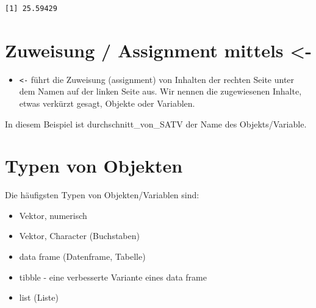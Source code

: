 \documentclass[
  letterpaper,
  DIV=11,
  numbers=noendperiod]{scrreprt}
\newenvironment{Shaded}{\begin{snugshade}}{\end{snugshade}}
\newcommand{\AttributeTok}[1]{\textcolor[rgb]{0.40,0.45,0.13}{#1}}
\newcommand{\ConstantTok}[1]{\textcolor[rgb]{0.56,0.35,0.01}{#1}}
\newcommand{\FunctionTok}[1]{\textcolor[rgb]{0.28,0.35,0.67}{#1}}
\newcommand{\NormalTok}[1]{\textcolor[rgb]{0.00,0.23,0.31}{#1}}
\newcommand{\OtherTok}[1]{\textcolor[rgb]{0.00,0.23,0.31}{#1}}
\newcommand{\SpecialCharTok}[1]{\textcolor[rgb]{0.37,0.37,0.37}{#1}}
\providecommand{\tightlist}{%
  \setlength{\itemsep}{0pt}\setlength{\parskip}{0pt}}\usepackage{longtable,booktabs,array}
\begin{document}
\begin{Shaded}
\end{Shaded}

\begin{verbatim}
[1] 25.59429
\end{verbatim}

\section{Zuweisung / Assignment mittels
\textless-}\label{zuweisung-assignment-mittels--}

\begin{itemize}
\tightlist
\item
  \texttt{\textless{}-} führt die Zuweisung (assignment) von Inhalten
  der rechten Seite unter dem Namen auf der linken Seite aus. Wir nennen
  die zugewiesenen Inhalte, etwas verkürzt gesagt, Objekte oder
  Variablen.
\end{itemize}

\begin{Shaded}
\end{Shaded}

In diesem Beispiel ist durchschnitt\_von\_SATV der Name des
Objekts/Variable.

\section{Typen von Objekten}\label{typen-von-objekten}

Die häufigsten Typen von Objekten/Variablen sind:

\begin{itemize}
\tightlist
\item
  Vektor, numerisch
\item
  Vektor, Character (Buchstaben)
\item
  data frame (Datenframe, Tabelle)
\item
  tibble - eine verbesserte Variante eines data frame
\item
  list (Liste)
\end{itemize}
\end{document}
